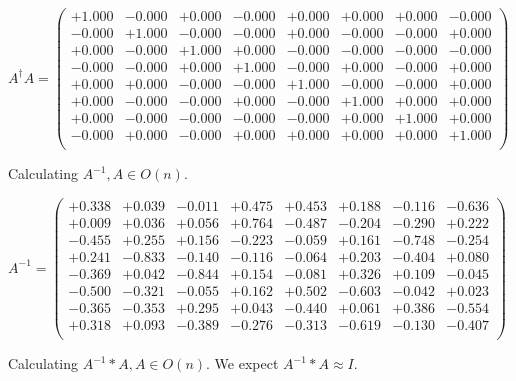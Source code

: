 \documentclass[9pt]{article}
\theoremstyle{plain}
\theoremstyle{definition}
\theoremstyle{remark}
\numberwithin{equation}{section}
\begin{document}
$A^{\dag} A = \left(
\begin{array}{
cccccccc}
+1.000 & -0.000 & +0.000 & -0.000 & +0.000 & +0.000 & +0.000 & -0.000 \\
-0.000 & +1.000 & -0.000 & -0.000 & +0.000 & -0.000 & -0.000 & +0.000 \\
+0.000 & -0.000 & +1.000 & +0.000 & -0.000 & -0.000 & -0.000 & -0.000 \\
-0.000 & -0.000 & +0.000 & +1.000 & -0.000 & +0.000 & -0.000 & +0.000 \\
+0.000 & +0.000 & -0.000 & -0.000 & +1.000 & -0.000 & -0.000 & +0.000 \\
+0.000 & -0.000 & -0.000 & +0.000 & -0.000 & +1.000 & +0.000 & +0.000 \\
+0.000 & -0.000 & -0.000 & -0.000 & -0.000 & +0.000 & +1.000 & +0.000 \\
-0.000 & +0.000 & -0.000 & +0.000 & +0.000 & +0.000 & +0.000 & +1.000 \\
\end{array}
\right)$ \newline 

Calculating $A^{-1} ,  A \in O(n)$.

$A^{-1} = \left(
\begin{array}{
cccccccc}
+0.338 & +0.039 & -0.011 & +0.475 & +0.453 & +0.188 & -0.116 & -0.636 \\
+0.009 & +0.036 & +0.056 & +0.764 & -0.487 & -0.204 & -0.290 & +0.222 \\
-0.455 & +0.255 & +0.156 & -0.223 & -0.059 & +0.161 & -0.748 & -0.254 \\
+0.241 & -0.833 & -0.140 & -0.116 & -0.064 & +0.203 & -0.404 & +0.080 \\
-0.369 & +0.042 & -0.844 & +0.154 & -0.081 & +0.326 & +0.109 & -0.045 \\
-0.500 & -0.321 & -0.055 & +0.162 & +0.502 & -0.603 & -0.042 & +0.023 \\
-0.365 & -0.353 & +0.295 & +0.043 & -0.440 & +0.061 & +0.386 & -0.554 \\
+0.318 & +0.093 & -0.389 & -0.276 & -0.313 & -0.619 & -0.130 & -0.407 \\
\end{array}
\right)$ \newline 

Calculating $A^{-1} *A  ,  A \in O(n)$.   We expect $A^{-1} *A  \approx I$. 
\end{document}
